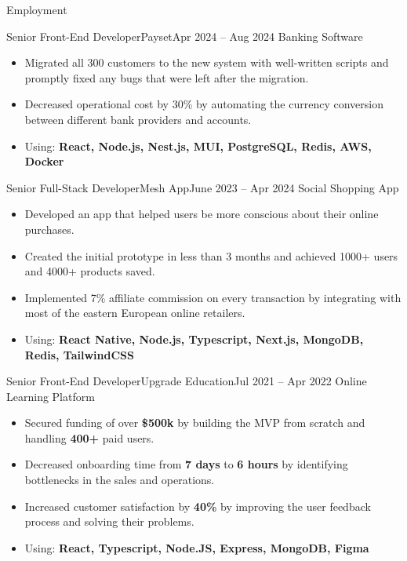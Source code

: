 \documentclass[]{mcdowellcv}
\begin{document}
	\makeheader
	
	\begin{cvsection}{Employment}
		\begin{cvsubsection}{Senior Front-End Developer}{Payset}{Apr 2024 -- Aug 2024}
			Banking Software
			\begin{itemize}
				\item Migrated all 300 customers to the new system with well-written scripts and promptly fixed any bugs that were left after the migration.
				\item Decreased operational cost by 30\% by automating the currency conversion between different bank providers and accounts.
				\item Using: \textbf{React, Node.js, Nest.js, MUI, PostgreSQL, Redis, AWS, Docker}
			\end{itemize}
		\end{cvsubsection}

		\begin{cvsubsection}{Senior Full-Stack Developer}{Mesh App}{June 2023 -- Apr 2024}
			Social Shopping App
			\begin{itemize}
				\item Developed an app that helped users be more conscious about their online purchases.
				\item Created the initial prototype in less than 3 months and achieved 1000+ users and 4000+ products saved.
				\item Implemented 7\% affiliate commission on every transaction by integrating with most of the eastern European online retailers.
				\item Using: \textbf{React Native, Node.js, Typescript, Next.js, MongoDB, Redis, TailwindCSS}
			\end{itemize}
		\end{cvsubsection}

		\begin{cvsubsection}{Senior Front-End Developer}{Upgrade Education}{Jul 2021 -- Apr 2022}
			Online Learning Platform
			\begin{itemize}
				\item Secured funding of over \textbf{\$500k} by building the MVP from scratch and handling \textbf{400+} paid users.
				\item Decreased onboarding time from \textbf{7 days} to \textbf{6 hours} by identifying bottlenecks in the sales and operations.
				\item Increased customer satisfaction by \textbf{40\%} by improving the user feedback process and solving their problems.
				\item Using: \textbf{React, Typescript, Node.JS, Express, MongoDB, Figma}
			\end{itemize}
		\end{cvsubsection}


\end{cvsection}
\end{document}
